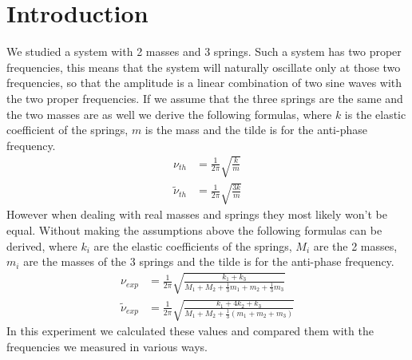 \documentclass{article}
\begin{document}
\section{Introduction} \label{sec:intro}
We studied a system with 2 masses and 3 springs. Such a system has 
two proper frequencies, this means 
that the system will naturally oscillate only at those two 
frequencies, so that the amplitude is a linear combination of two 
sine waves with the two proper frequencies. If we assume that 
the three springs are the same and the two masses are as well 
we derive the following formulas, where $k$ is the elastic coefficient of the springs, $m$ is the mass and the tilde is for the anti-phase frequency.
\begin{align}
    \nu_{th} &= \frac{1}{2\pi}   \sqrt{\frac{ k}{m}}
        \label{eq:nuth} \\
    \tilde \nu_{th} &= \frac{1}{2\pi}   \sqrt{\frac{3k}{m}}
        \label{eq:antinuth}
\end{align}
However when dealing with real masses and springs they most 
likely won't be equal. Without making the assumptions above 
the following formulas can be derived, where $k_i$ are the elastic coefficients of the springs, $M_i$ are the 2 masses, $m_i$ are the masses of the 3 springs and the tilde is for the anti-phase frequency.
\begin{align}
           \nu_{exp} &= \frac{1}{2\pi}   \sqrt{\frac{k_1+k_3}
           {M_1 + M_2 + \frac{1}{3} m_1 + m_2 + \frac{1}{3}m_3 }} 
           \label{eq:nuexp}  \\
    \tilde \nu_{exp} &= \frac{1}{2\pi}   \sqrt{\frac{k_1 +4k_2 +k_3}
           {M_1 + M_2 + \frac{1}{3} (m_1 + m_2 + m_3) }} 
           \label{eq:antinuexp} 
\end{align}
In this experiment we calculated these values and compared them with the frequencies we measured in various ways. 
\end{document}
